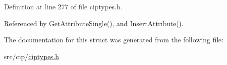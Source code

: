 \-Definition at line 277 of file ciptypes.\-h.



\-Referenced by \-Get\-Attribute\-Single(), and \-Insert\-Attribute().



\-The documentation for this struct was generated from the following file\-:\begin{DoxyCompactItemize}
\item 
src/cip/\hyperlink{ciptypes_8h}{ciptypes.\-h}\end{DoxyCompactItemize}
